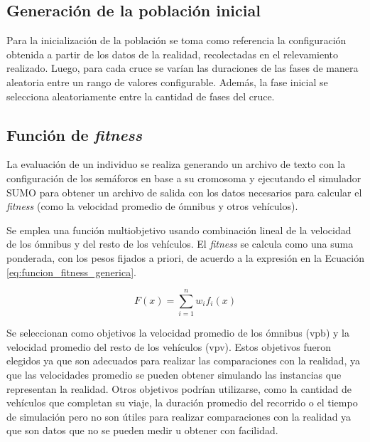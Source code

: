 \subsection{Generación de la población inicial}

Para la inicialización de la población se toma como referencia
la configuración obtenida a partir de los datos de la realidad, recolectadas en el relevamiento realizado. Luego, para cada cruce se varían las duraciones de las fases de manera aleatoria entre un rango de valores configurable. Además, la fase inicial se selecciona aleatoriamente entre la cantidad de fases del cruce.

\subsection{Función de \emph{fitness}}


La evaluación de un individuo se realiza generando un archivo de texto con la configuración de los semáforos en base a su cromosoma y ejecutando el simulador SUMO para obtener un archivo de salida con los datos necesarios para calcular el \emph{fitness} (como la velocidad promedio de ómnibus y otros vehículos).

Se emplea una función multiobjetivo usando combinación lineal de la velocidad de los ómnibus y del resto de los vehículos.
El \emph{fitness} se calcula como una suma ponderada, con los pesos fijados a priori, de acuerdo a la expresión en la Ecuación \ref{eq:funcion_fitness_generica}.

\begin{equation}
\label{eq:funcion_fitness_generica}
F(x) = \sum_{i=1}^{n}{w_i}{f_i}(x)
\end{equation}

Se seleccionan como objetivos la velocidad promedio de los ómnibus (vpb) y la velocidad promedio del resto de los vehículos (vpv). Estos objetivos fueron elegidos ya que son  adecuados para realizar las comparaciones con la realidad, ya que las velocidades promedio se pueden obtener simulando las instancias que representan la realidad. Otros objetivos podrían utilizarse, como la cantidad de vehículos que completan su viaje, la duración promedio del recorrido o el tiempo de simulación pero no son útiles para realizar comparaciones con la realidad ya que son datos que no se pueden medir u obtener con facilidad.

